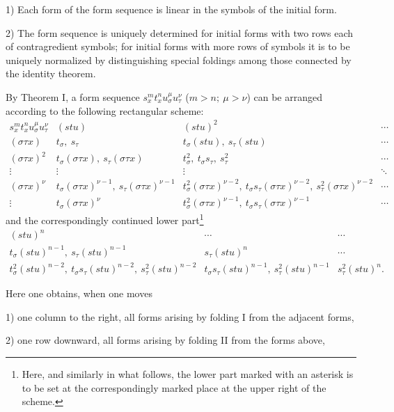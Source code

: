 \documentclass[11pt]{article}
\begin{document}
1) Each form of the form sequence is linear in the symbols of the initial form.

2) The form sequence is uniquely determined for initial forms with two rows each of contragredient symbols; for initial forms with more rows of symbols it is to be uniquely normalized by distinguishing special foldings among those connected by the identity theorem.

By Theorem I, a form sequence $s_x^m t_x^n u_\sigma^\mu u_\tau^\nu$ ($m>n;\ \mu>\nu$) can be arranged according to the following rectangular scheme:
\begingroup\small
\[
\begin{array}{c|c|c|c}
s_x^m t_x^n u_\sigma^\mu u_\tau^\nu
& (stu)
& (stu)^2
& \cdots\\[0.3em]
(\sigma\tau x)
& t_\sigma,\ s_\tau
& t_\sigma(stu),\ s_\tau(stu)
& \cdots\\[0.3em]
(\sigma\tau x)^2
& t_\sigma(\sigma\tau x),\ s_\tau(\sigma\tau x)
& t_\sigma^2,\ t_\sigma s_\tau,\ s_\tau^2
& \cdots\\[0.3em]
\vdots&\vdots&\vdots&\ddots\\[0.3em]
(\sigma\tau x)^\nu
& t_\sigma(\sigma\tau x)^{\nu-1},\ s_\tau(\sigma\tau x)^{\nu-1}
& t_\sigma^2(\sigma\tau x)^{\nu-2},\ t_\sigma s_\tau(\sigma\tau x)^{\nu-2},\ s_\tau^2(\sigma\tau x)^{\nu-2}
& \cdots\\[0.3em]
\vdots
& t_\sigma(\sigma\tau x)^\nu
& t_\sigma^2(\sigma\tau x)^{\nu-1},\ t_\sigma s_\tau(\sigma\tau x)^{\nu-1}
& \cdots
\end{array}
\]
\endgroup
and the correspondingly continued lower part\footnote{Here, and similarly in what follows, the lower part marked with an asterisk is to be set at the correspondingly marked place at the upper right of the scheme.}
\begingroup\small
\[
\begin{array}{c|c|c}
(stu)^n & \cdots & \cdots\\[0.3em]
t_\sigma(stu)^{n-1},\ s_\tau(stu)^{n-1}
& s_\tau(stu)^n & \cdots\\[0.3em]
t_\sigma^2(stu)^{n-2},\ t_\sigma s_\tau(stu)^{n-2},\ s_\tau^2(stu)^{n-2}
& t_\sigma s_\tau(stu)^{n-1},\ s_\tau^2(stu)^{n-1}
& s_\tau^2(stu)^n .
\end{array}
\]
\endgroup

Here one obtains, when one moves

1) one column to the right, all forms arising by folding I from the adjacent forms,

2) one row downward, all forms arising by folding II from the forms above,
\end{document}
